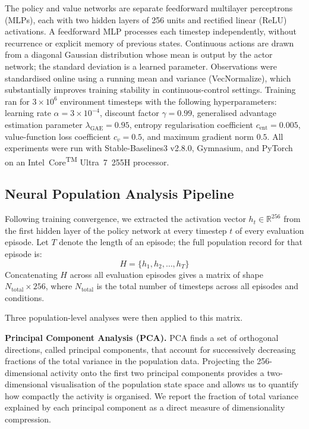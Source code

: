 \documentclass{article}
\begin{document}
The policy and value networks are separate feedforward multilayer
perceptrons (MLPs), each with two hidden layers of 256 units and
rectified linear (ReLU) activations.
A feedforward MLP processes each timestep independently, without recurrence
or explicit memory of previous states.
Continuous actions are drawn from a diagonal Gaussian distribution whose
mean is output by the actor network; the standard deviation is a learned
parameter.
Observations were standardised online using a running mean and variance
(VecNormalize), which substantially improves training stability in
continuous-control settings.
Training ran for $3\times10^6$ environment timesteps with the following
hyperparameters: learning rate $\alpha = 3\times10^{-4}$, discount factor
$\gamma = 0.99$, generalised advantage estimation parameter
$\lambda_{\mathrm{GAE}} = 0.95$, entropy regularisation coefficient
$c_{\mathrm{ent}} = 0.005$, value-function loss coefficient $c_v = 0.5$,
and maximum gradient norm $0.5$.
All experiments were run with Stable-Baselines3 v2.8.0, Gymnasium,
and PyTorch on an Intel\textregistered\ Core\textsuperscript{TM} Ultra~7~255H
processor.

\subsection{Neural Population Analysis Pipeline}

Following training convergence, we extracted the activation vector
$h_t \in \mathbb{R}^{256}$ from the first hidden layer of the policy
network at every timestep $t$ of every evaluation episode.
Let $T$ denote the length of an episode; the full population record for
that episode is:
\begin{equation}
  H = \{h_1, h_2, \ldots, h_T\}
  \label{eq:latent}
\end{equation}
Concatenating $H$ across all evaluation episodes gives a matrix of
shape $N_{\mathrm{total}} \times 256$, where $N_{\mathrm{total}}$ is the
total number of timesteps across all episodes and conditions.

Three population-level analyses were then applied to this matrix.

\textbf{Principal Component Analysis (PCA).}
PCA finds a set of orthogonal directions, called principal components, that
account for successively decreasing fractions of the total variance in
the population data.
Projecting the 256-dimensional activity onto the first two principal
components provides a two-dimensional visualisation of the population
state space and allows us to quantify how compactly the activity is
organised.
We report the fraction of total variance explained by each principal
component as a direct measure of dimensionality compression.
\end{document}
